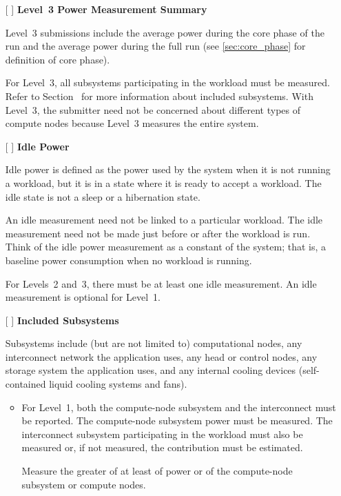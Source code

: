 \begin{itemize}
\item[{[ ]}]
\textbf{Level~3 Power Measurement Summary}

Level~3 submissions include the average power during the core phase of the run and the average power during the full run (see \ref{sec:core_phase} for definition of core phase).

For Level~3, all subsystems participating in the workload must be measured.
Refer to Section~ for more information about included subsystems.
With Level~3, the submitter need not be concerned about different types of compute nodes because Level~3 measures the entire system.

\item[{[ ]}]
\textbf{Idle Power}

Idle power is defined as the power used by the system when it is not running a workload, but it is in a state where it is ready to accept a workload.
The idle state is not a sleep or a hibernation state.

An idle measurement need not be linked to a particular workload.
The idle measurement need not be made just before or after the workload is run.
Think of the idle power measurement as a constant of the system; that is,
a baseline power consumption when no workload is running.

For Levels~2 and~3, there must be at least one idle measurement.
An idle measurement is optional for Level~1.

\item[{[ ]}]
\textbf{Included Subsystems}

Subsystems include (but are not limited to) computational nodes, any interconnect network the application uses, any head or control nodes, any storage system the application uses, and any internal cooling devices (self-contained liquid cooling systems and fans).

\begin{itemize}
\item
For Level~1, both the compute-node subsystem and the interconnect must be reported.
The compute-node subsystem power must be measured.
The interconnect subsystem participating in the workload must also be measured or, if not measured, the contribution must be estimated.

Measure the greater of at least \SpecPowerMinLOne{} of power or \SpecFracMinLOne{} of the compute-node subsystem or \SpecMinNodes{} compute nodes.


\end{itemize}
\end{itemize}
